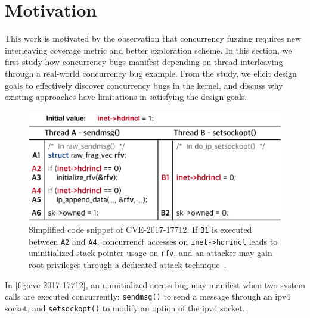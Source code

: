 \section{Motivation}
\label{s:motivation}


This work is motivated by the observation that concurrency fuzzing
requires new interleaving coverage metric and better exploration
scheme.  In this section, we first study how concurrency bugs manifest
depending on thread interleaving through a real-world concurrency bug
example.
%
From the study, we elicit design goals to effectively discover concurrency
bugs in the kernel, and discuss why existing approaches have limitations 
in satisfying the design goals.

%

%
\begin{figure}[t]
  \centering
  \includegraphics[width=0.85\linewidth]{fig/cve-2017-10661.pdf}
  \caption{Simplified code snippet of CVE-2017-17712. If \texttt{B1}
    is executed between \texttt{A2} and \texttt{A4}, concurrenct
    accesses on \texttt{inet->hdrincl} leads to uninitialized stack
    pointer usage on \texttt{rfv}, and an attacker may gain root
    privileges through a dedicated attack
    technique~\cite{stackspray}.}
  \label{fig:cve-2017-17712}
\end{figure}
%
In \autoref{fig:cve-2017-17712}, an uninitialized access bug may
manifest when two system calls are executed concurrently:
\texttt{sendmsg()} to send a message through an ipv4 socket, and
\texttt{setsockopt()} to modify an option of the ipv4 socket.

